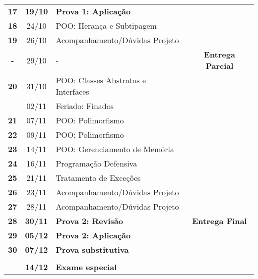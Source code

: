 \documentclass[11pt]{article}
\begin{document}
\begin{center}
\begin{tabular}{>{\bfseries}ccl>{\bfseries}c}
\rowcolor{yellow!50} 17 & \textbf{19/10} & \textbf{Prova 1: Aplicação} & \\[0pt]
18 & 24/10 & POO: Herança e Subtipagem & \\[0pt]
19 & 26/10 & Acompanhamento/Dúvidas Projeto & \\[0pt]
- & 29/10 & - & Entrega Parcial\\[0pt]
20 & 31/10 & POO: Classes Abstratas e Interfaces & \\[0pt]
\rowcolor{green!40} & 02/11 & Feriado: Finados & \\[0pt]
21 & 07/11 & POO: Polimorfismo & \\[0pt]
22 & 09/11 & POO: Polimorfismo & \\[0pt]
23 & 14/11 & POO: Gerenciamento de Memória & \\[0pt]
24 & 16/11 & Programação Defensiva & \\[0pt]
25 & 21/11 & Tratamento de Exceções & \\[0pt]
26 & 23/11 & Acompanhamento/Dúvidas Projeto & \\[0pt]
27 & 28/11 & Acompanhamento/Dúvidas Projeto & \\[0pt]
\rowcolor{yellow!50} 28 & \textbf{30/11} & \textbf{Prova 2: Revisão} & Entrega Final\\[0pt]
\rowcolor{yellow!50} 29 & \textbf{05/12} & \textbf{Prova 2: Aplicação} & \\[0pt]
\rowcolor{yellow!50} 30 & \textbf{07/12} & \textbf{Prova substitutiva} & \\[0pt]
 &  &  & \\[0pt]
\rowcolor{yellow!50} & \textbf{14/12} & \textbf{Exame especial} & \\[0pt]
\bottomrule
\end{tabular}
\end{center}
\end{document}
